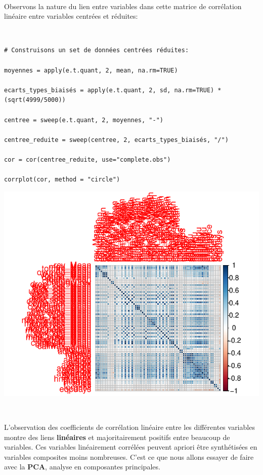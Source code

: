 \documentclass[]{imsart}
\numberwithin{equation}{section}
\theoremstyle{plain}
\begin{document}
~

Observons la nature du lien entre variables dans cette matrice de corrélation linéaire entre variables centrées et réduites:

~

\begin{verbatim}
# Construisons un set de données centrées réduites:

moyennes = apply(e.t.quant, 2, mean, na.rm=TRUE)

ecarts_types_biaisés = apply(e.t.quant, 2, sd, na.rm=TRUE) * (sqrt(4999/5000))

centree = sweep(e.t.quant, 2, moyennes, "-")

centree_reduite = sweep(centree, 2, ecarts_types_biaisés, "/")

cor = cor(centree_reduite, use="complete.obs")

corrplot(cor, method = "circle")
\end{verbatim}

\begin{flushleft}\includegraphics{Analyse_Exploratoire_Projet_files/figure-latex/unnamed-chunk-11-1} \end{flushleft}

~

L'observation des coefficients de corrélation linéaire entre les différentes variables montre des liens \textbf{linéaires} et majoritairement positifs entre beaucoup de variables. Ces variables linéairement corrélées peuvent apriori être synthétisées en variables composites moins nombreuses. C'est ce que nous allons essayer de faire avec la \textbf{PCA}, analyse en composantes principales.
\end{document}
